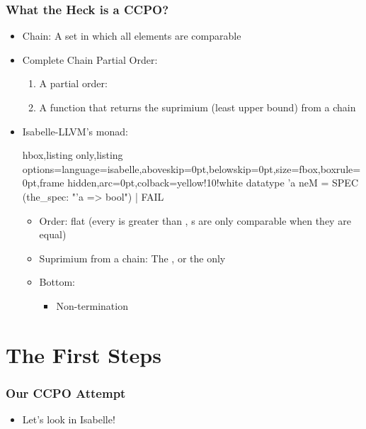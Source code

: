 \documentclass[aspectratio=169,10pt]{beamer}
\begin{document}
\begin{frame}[fragile]
  \frametitle{What the Heck is a CCPO?}
  \begin{itemize}
    \item Chain: A set in which all elements are comparable
    \item Complete Chain Partial Order:
          \begin{enumerate}
            \item A partial order: 
            \item A function that returns the suprimium (least upper bound) from a chain 
          \end{enumerate}
    \pause
    \item Isabelle-LLVM's monad:
          \vspace*{-1ex}
          \begin{tcblisting}{hbox,listing only,listing options={language=isabelle,aboveskip=0pt,belowskip=0pt},size=fbox,boxrule=0pt,frame hidden,arc=0pt,colback=yellow!10!white}
datatype 'a neM = SPEC (the_spec: "'a => bool") | FAIL
          \end{tcblisting}
          \vspace*{-1ex}
          \begin{itemize}
            \item Order: flat (every  is greater than , s are only comparable when they are equal)
            \item Suprimium from a chain: The , or the only 
            \item Bottom: 
                  \begin{itemize}
                    \item Non-termination
                  \end{itemize}
          \end{itemize}
  \end{itemize}
\end{frame}

\section{The First Steps}

\begin{frame}[fragile]
  \frametitle{Our CCPO Attempt}
  \begin{itemize}
    \item Let's look in Isabelle!
  \end{itemize}
\end{frame}
\end{document}
